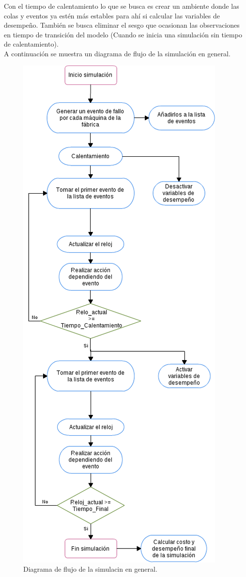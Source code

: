 \documentclass[12pt]{article}
\begin{document}

Con el tiempo de calentamiento lo que se busca es crear un ambiente donde las colas y eventos ya estén más estables para ahí si calcular las variables de desempeño. También se busca eliminar el sesgo que ocasionan las observaciones en tiempo de transición del modelo (Cuando se inicia una simulación sin tiempo de calentamiento). \\


A continuación se muestra un diagrama de flujo de la simulación en general.\\

\begin{figure}
  \centering
    \includegraphics[scale=0.6]{Simulacion_flujo.png}
  \caption{Diagrama de flujo de la simulacin en general.}
  \label{fig:simulacion}
\end{figure}
\end{document}
